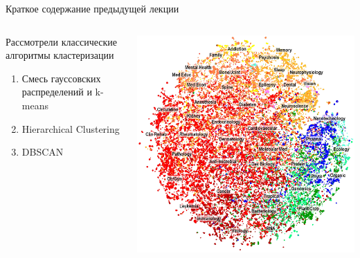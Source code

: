 \documentclass[10pt]{beamer}
\begin{document}
\begin{frame}{Краткое содержание предыдущей лекции}

\begin{columns}[C]
    \begin{column}{.4\textwidth}
    	Рассмотрели классические алгоритмы кластеризации
		\begin{enumerate}
			\item Смесь гауссовских распределений и k-means
			\item Hierarchical Clustering
			\item DBSCAN
		\end{enumerate}    	
    \end{column}
       
    \begin{column}{.6\textwidth}
    \vspace{-0em}
	\begin{center}
   		\includegraphics[width=\textwidth]{images/medical.png}
    \end{center}
    \end{column}
  \end{columns}

\end{frame}

\end{document}
